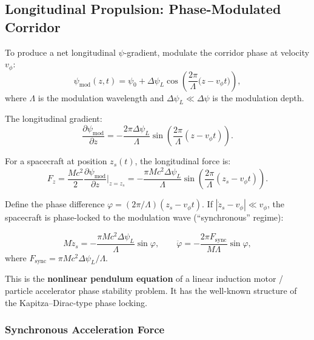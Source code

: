 \documentclass[aps,prd,twocolumn,superscriptaddress]{revtex4-2}
\begin{document}
\subsection{Longitudinal Propulsion: Phase-Modulated Corridor}
\label{sec:propulsion}

To produce a net longitudinal $\psi$-gradient, modulate the corridor
phase at velocity $v_\phi$:
\begin{equation}
\psi_\mathrm{mod}(z,t) = \psi_0 + \Delta\psi_L\cos\!\left(\frac{2\pi}{\Lambda}\bigl(z - v_\phi t\bigr)\right),
\label{eq:modulation}
\end{equation}
where $\Lambda$ is the modulation wavelength and
$\Delta\psi_L \ll \Delta\psi$ is the modulation depth.

The longitudinal gradient:
\begin{equation}
\frac{\partial\psi_\mathrm{mod}}{\partial z} = -\frac{2\pi\Delta\psi_L}{\Lambda}\sin\!\left(\frac{2\pi}{\Lambda}(z - v_\phi t)\right).
\label{eq:dpsi_dz}
\end{equation}

For a spacecraft at position $z_s(t)$, the longitudinal force is:
\begin{equation}
F_z = \frac{Mc^2}{2}\frac{\partial\psi_\mathrm{mod}}{\partial z}\biggr|_{z=z_s}
= -\frac{\pi Mc^2\Delta\psi_L}{\Lambda}\sin\!\left(\frac{2\pi}{\Lambda}(z_s - v_\phi t)\right).
\label{eq:F_z}
\end{equation}

Define the phase difference $\varphi = (2\pi/\Lambda)(z_s - v_\phi t)$.
If $|\dot{z}_s - v_\phi| \ll v_\phi$, the spacecraft is phase-locked
to the modulation wave (``synchronous'' regime):

\begin{equation}
\boxed{
M\ddot{z}_s = -\frac{\pi Mc^2\Delta\psi_L}{\Lambda}\sin\varphi,
\qquad
\ddot{\varphi} = -\frac{2\pi F_\mathrm{sync}}{M\Lambda}\sin\varphi,
}
\label{eq:pendulum}
\end{equation}
where $F_\mathrm{sync} = \pi Mc^2\Delta\psi_L/\Lambda$.

This is the \textbf{nonlinear pendulum equation} of a linear induction
motor / particle accelerator phase stability problem.  It has the
well-known structure of the Kapitza--Dirac-type phase locking.

\subsubsection{Synchronous Acceleration Force}
\end{document}
